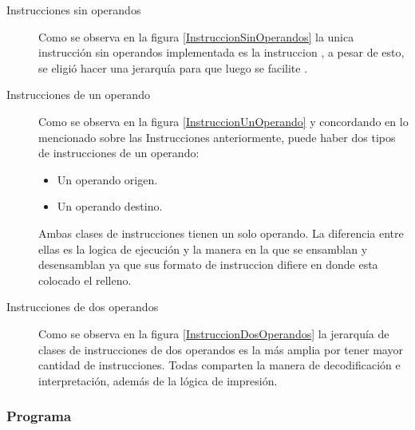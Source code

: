 \begin{description}
\item[Instrucciones sin operandos] Como se observa en la figura \ref{InstruccionSinOperandos} la unica instrucción sin operandos implementada es la instruccion , a pesar de esto, se eligió hacer una jerarquía para que luego se facilite  .


\item[Instrucciones de un operando] 
Como se observa en la figura \ref{InstruccionUnOperando} y concordando en lo mencionado sobre las Instrucciones anteriormente, puede haber dos tipos de instrucciones de un operando:

\begin{itemize}
\item Un operando origen.
\item Un operando destino.
\end{itemize}

Ambas clases de instrucciones tienen un solo operando. La diferencia entre ellas es la logica de ejecución y la manera en la que se ensamblan y desensamblan ya que sus formato de instruccion difiere en donde esta colocado el relleno.



\item[Instrucciones de dos operandos]

Como se observa en la figura \ref{InstruccionDosOperandos} la jerarquía de clases de instrucciones de dos operandos es la más amplia por tener mayor cantidad de instrucciones. Todas comparten la manera de decodificación e interpretación, además de la lógica de impresión.


\end{description}




\subsubsection{Programa}

